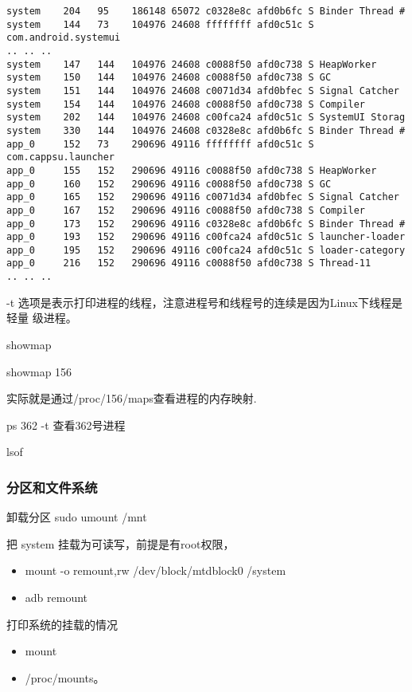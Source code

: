 \documentclass[a4paper,titlepage]{article}
\begin{document}
\begin{lstlisting}[basicstyle=\tiny]
system    204   95    186148 65072 c0328e8c afd0b6fc S Binder Thread #
system    144   73    104976 24608 ffffffff afd0c51c S com.android.systemui
.. .. ..
system    147   144   104976 24608 c0088f50 afd0c738 S HeapWorker
system    150   144   104976 24608 c0088f50 afd0c738 S GC
system    151   144   104976 24608 c0071d34 afd0bfec S Signal Catcher
system    154   144   104976 24608 c0088f50 afd0c738 S Compiler
system    202   144   104976 24608 c00fca24 afd0c51c S SystemUI Storag
system    330   144   104976 24608 c0328e8c afd0b6fc S Binder Thread #
app_0     152   73    290696 49116 ffffffff afd0c51c S com.cappsu.launcher
app_0     155   152   290696 49116 c0088f50 afd0c738 S HeapWorker
app_0     160   152   290696 49116 c0088f50 afd0c738 S GC
app_0     165   152   290696 49116 c0071d34 afd0bfec S Signal Catcher
app_0     167   152   290696 49116 c0088f50 afd0c738 S Compiler
app_0     173   152   290696 49116 c0328e8c afd0b6fc S Binder Thread #
app_0     193   152   290696 49116 c00fca24 afd0c51c S launcher-loader
app_0     195   152   290696 49116 c00fca24 afd0c51c S loader-category
app_0     216   152   290696 49116 c0088f50 afd0c738 S Thread-11
.. .. ..
\end{lstlisting}

 -t 选项是表示打印进程的线程，注意进程号和线程号的连续是因为Linux下线程是轻量
 级进程。

showmap

showmap 156

实际就是通过/proc/156/maps查看进程的内存映射.

 ps 362 -t
 查看362号进程

lsof

\subsubsection{分区和文件系统}
卸载分区
sudo umount /mnt



把 system 挂载为可读写，前提是有root权限， 
\begin{itemize}
    \item mount -o remount,rw  /dev/block/mtdblock0 /system
    \item adb remount
\end{itemize}

打印系统的挂载的情况
\begin{itemize}
    \item mount 
    \item /proc/mounts。
\end{itemize}
\end{document}
